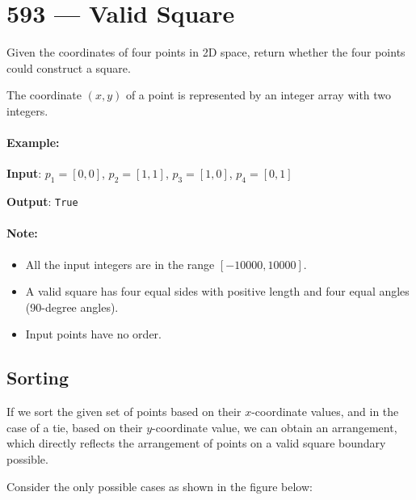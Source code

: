 \section{593 --- Valid Square}
Given the coordinates of four points in 2D space, return whether the four points could construct a square.

The coordinate $(x,y)$ of a point is represented by an integer array with two integers.

\paragraph{Example:}

\begin{flushleft}

\textbf{Input}: $p_1 = [0,0]$, $p_2 = [1,1]$, $p_3 = [1,0]$, $p_4 = [0,1]$

\textbf{Output}: \texttt{True}

\end{flushleft} 

\paragraph{Note:}

\begin{itemize}
\item All the input integers are in the range $[-10000, 10000]$.
\item A valid square has four equal sides with positive length and four equal angles (90-degree angles).
\item Input points have no order.
\end{itemize}

\subsection{Sorting}
If we sort the given set of points based on their $x$-coordinate values, and in the case of a tie, based on their $y$-coordinate value, we can obtain an arrangement, which directly reflects the arrangement of points on a valid square boundary possible.

Consider the only possible cases as shown in the figure below:

